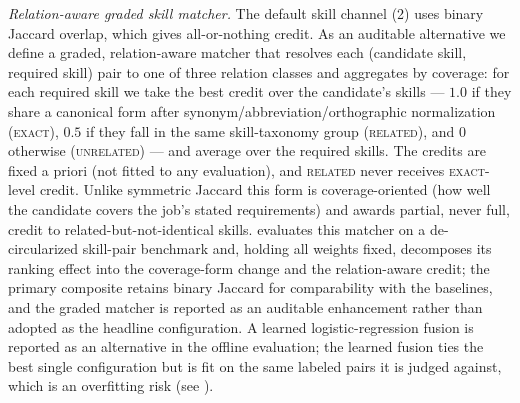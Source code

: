 \emph{Relation-aware graded skill matcher.} The default skill channel (2) uses binary Jaccard overlap, which gives all-or-nothing credit. As an auditable alternative we define a graded, relation-aware matcher that resolves each (candidate skill, required skill) pair to one of three relation classes and aggregates by coverage: for each required skill we take the best credit over the candidate's skills --- $1.0$ if they share a canonical form after synonym/abbreviation/orthographic normalization (\textsc{exact}), $0.5$ if they fall in the same skill-taxonomy group (\textsc{related}), and $0$ otherwise (\textsc{unrelated}) --- and average over the required skills. The credits are fixed a priori (not fitted to any evaluation), and \textsc{related} never receives \textsc{exact}-level credit. Unlike symmetric Jaccard this form is coverage-oriented (how well the candidate covers the job's stated requirements) and awards partial, never full, credit to related-but-not-identical skills.  evaluates this matcher on a de-circularized skill-pair benchmark and, holding all weights fixed, decomposes its ranking effect into the coverage-form change and the relation-aware credit; the primary composite retains binary Jaccard for comparability with the baselines, and the graded matcher is reported as an auditable enhancement rather than adopted as the headline configuration.
A learned logistic-regression fusion is reported as an alternative in the offline evaluation; the learned fusion ties the best single configuration but is fit on the same labeled pairs it is judged against, which is an overfitting risk (see ).

